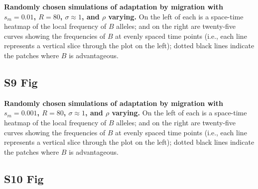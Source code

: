 \documentclass[10pt,letterpaper]{article}
\begin{document}
\textbf{Randomly chosen simulations of adaptation by migration
with $s_m=0.01$, $R=80$, $\sigma\approx 1$, and $\rho$ varying.}
    On the left of each is a space-time heatmap of the local frequency of $B$ alleles;
    and on the right are twenty-five curves showing the frequencies of $B$ at evenly spaced time points
    (i.e., each line represents a vertical slice through the plot on the left);
    dotted black lines indicate the patches where $B$ is advantageous.

\subsection*{S9 Fig}
\label{sfig:sims_7}

\textbf{Randomly chosen simulations of adaptation by migration
with $s_m=0.001$, $R=80$, $\sigma\approx 1$, and $\rho$ varying.}
    On the left of each is a space-time heatmap of the local frequency of $B$ alleles;
    and on the right are twenty-five curves showing the frequencies of $B$ at evenly spaced time points
    (i.e., each line represents a vertical slice through the plot on the left);
    dotted black lines indicate the patches where $B$ is advantageous.

\subsection*{S10 Fig}
\label{sfig:sims_8}
\end{document}
